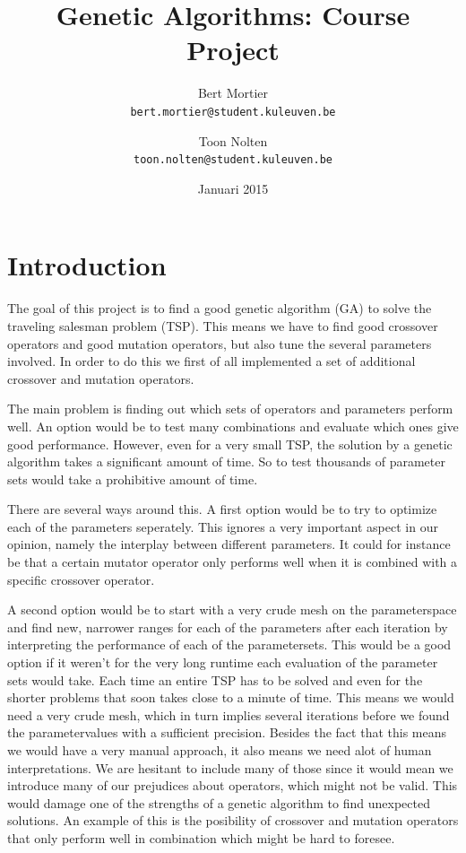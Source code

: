 \documentclass[a4paper]{article}
\title{Genetic Algorithms: Course Project}
\author{Bert Mortier \\
		\texttt{bert.mortier@student.kuleuven.be}
        \and
        Toon Nolten \\
        \texttt{toon.nolten@student.kuleuven.be}}
\date{Januari 2015}
\begin{document}
\maketitle

\section{Introduction}
The goal of this project is to find a good genetic algorithm (GA) to solve the traveling salesman problem (TSP). This means we have to find good crossover operators and good mutation operators, but also tune the several parameters involved. In order to do this we first of all implemented a set of additional crossover and mutation operators.
\par
The main problem is finding out which sets of operators and parameters perform well. An option would be to test many combinations and evaluate which ones give good performance. However, even for a very small TSP, the solution by a genetic algorithm takes a significant amount of time. So to test thousands of parameter sets would take a prohibitive amount of time.
\par
There are several ways around this. A first option would be to try to optimize each of the parameters seperately. This ignores a very important aspect in our opinion, namely the interplay between different parameters. It could for instance be that a certain mutator operator only performs well when it is combined with a specific crossover operator.
\par
A second option would be to start with a very crude mesh on the parameterspace and find new, narrower ranges for each of the parameters after each iteration by interpreting the performance of each of the parametersets. This would be a good option if it weren't for the very long runtime each evaluation of the parameter sets would take. Each time an entire TSP has to be solved and even for the shorter problems that soon takes close to a minute of time. This means we would need a very crude mesh, which in turn implies several iterations before we found the parametervalues with a sufficient precision. Besides the fact that this means we would have a very manual approach, it also means we need alot of human interpretations. We are hesitant to include many of those since it would mean we introduce many of our prejudices about operators, which might not be valid. This would damage one of the strengths of a genetic algorithm to find unexpected solutions.
An example of this is the posibility of crossover and mutation operators that only perform well in combination which might be hard to foresee.
\end{document}

